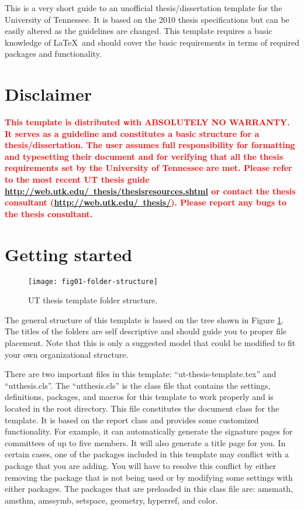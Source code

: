 


This is a very short guide to an unofficial thesis/dissertation template for the University of Tennessee. It is based on the 2010 thesis specifications but can be easily altered as the guidelines are changed. This template requires a basic knowledge of \LaTeX\ and should cover the basic requirements in terms of required packages and functionality.

\section{Disclaimer}
\textcolor{red}{\bf
This template is distributed with ABSOLUTELY NO WARRANTY. It serves as a guideline and constitutes a basic structure for a thesis/dissertation. The user assumes full responsibility for formatting and typesetting their document and for verifying that all the thesis requirements set by the University of Tennessee are met. Please refer to the most recent UT thesis guide \href{http://web.utk.edu/~thesis/thesisresources.shtml}{http://web.utk.edu/~thesis/thesisresources.shtml} or contact the thesis consultant (\href{http://web.utk.edu/~thesis/}{http://web.utk.edu/~thesis/}). Please report any bugs to the thesis consultant.}

\section{Getting started}
\begin{figure}[b!]
  \centering
  \texttt{[image: fig01-folder-structure]}\\
  \caption{UT thesis template folder structure.}\label{fig:intro-folder-structure}
\end{figure}
The general structure of this template is based on the tree shown in Figure \ref{fig:intro-folder-structure}. The titles of the folders are self descriptive and should guide you to proper file placement. Note that this is only a suggested model that could be modified to fit your own organizational structure.

There are two important files in this template: ``ut-thesis-template.tex'' and ``utthesis.cls''. The ``utthesis.cls'' is the class file that contains the settings, definitions, packages, and macros for this template to work properly and is located in the root directory. This file constitutes the document class for the template. It is based on the report class and provides some customized functionality. For example, it can automatically generate the signature pages for committees of up to five members. It will also generate a title page for you. In certain cases, one of the packages included in this template may conflict with a package that you are adding. You will have to resolve this conflict by either removing the package that is not being used or by modifying some settings with either packages. The packages that are preloaded in this class file are: amsmath, amsthm, amssymb, setspace, geometry, hyperref, and color.

